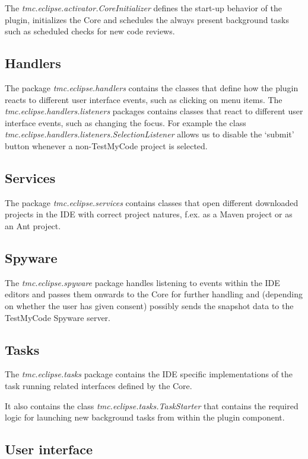 \documentclass[12pt,a4paper,english,leqno]{article}
\begin{document}
The \textit{tmc.eclipse.activator.CoreInitializer} defines the start-up behavior of the plugin, initializes the Core and schedules the always present background tasks such as scheduled checks for new code reviews.

\subsection{Handlers}

The package \textit{tmc.eclipse.handlers} contains the classes that define how the plugin reacts to different user interface events, such as clicking on menu items.
The \textit{tmc.eclipse.handlers.listeners} packages contains classes that react to different user interface events, such as changing the focus.
For example the class \textit{tmc.eclipse.handlers.listeners.SelectionListener} allows us to disable the `submit' button whenever a non-TestMyCode project is selected.

\subsection{Services}

The package \textit{tmc.eclipse.services} contains classes that open different downloaded projects in the IDE with correct project natures, f.ex. as a Maven project or as an Ant project.

\subsection{Spyware}

The \textit{tmc.eclipse.spyware} package handles listening to events within the IDE editors and passes them onwards to the Core for further handling and (depending on whether the user has given consent) possibly sends the snapshot data to the TestMyCode Spyware server.

\subsection{Tasks}

The \textit{tmc.eclipse.tasks} package contains the IDE specific implementations of the task running related interfaces defined by the Core.

It also contains the class \textit{tmc.eclipse.tasks.TaskStarter} that contains the required logic for launching new background tasks from within the plugin component.

\subsection{User interface}
\end{document}
